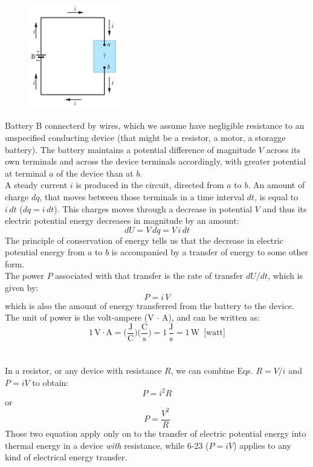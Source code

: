 \documentclass[12pt, a4paper]{article}
\begin{document}
		\begin{figure}
			\centering
			\includegraphics[width=4cm]{Physics2_PNGs/battery-circ.png}
			\caption*{}
			\label{fig:battery-circ.png}
		\end{figure}
		Battery B connecterd by wires, which we assume have negligible resistance to an unspecified conducting device (that might be a resistor, a motor, a storagge battery). The battery maintains a potential difference of magnitude $V$ across its own terminals and across the device terminals accordingly, with greater potential at terminal $a$ of the device than at $b$. \\
		A steady current $i$ is produced in the circuit, directed from $a$ to $b$. An amount of charge $dq$, that moves between those terminals in a time interval $dt$, is equal to $i \, dt$ ($dq = i \, dt$). This charges moves through a decrease in potential $V$ and thus its electric potential energy decreases in magnitude by an amount:
		\[
			dU = V \, dq = V \, i \, dt
			\tag{6-22}
		\] 
		The principle of conservation of energy tells us that the decrease in electric potential energy from $a$ to $b$ is accompanied by a transfer of energy to some other form. \\
		The power $P$ associated with that transfer is the rate of transfer $dU/dt$, which is given by:
		\[
			P = i \, V
			\tag{Rate of Electrical Energy Transfer, 6-23}
		\]
		which is also the amount of energy transferred from the battery to the device. \\
		The unit of power is the volt-ampere (V $\cdot$ A), and can be written as:
		\[
			1 \, \text{V} \cdot \text{A} = \biggl( \frac{\text{J}}{\text{C}} \biggl)
			  \biggl( \frac{\text{C}}{\text{s}} \biggl) = 1 \, \frac{\text{J}}{\text{s}}
			  = 1 \, \text{W} \, \, \, \text{[watt]}
		\]
		\\ \\
		In a resistor, or any device with resistance $R$, we can combine Eqs. $R = V / i$ and $P = iV$ to obtain:
		\[
			P = i^2 R
			\tag{Resistive Dissipation, 6-24}
		\]
		or
		\[
			P = \frac{V^2}{R}
			\tag{Resistive Dissipation, 6-25}
		\]
		Those two equation apply only on to the transfer of electric potential energy into thermal energy in a device \textit{with} resistance, while 6-23 ($P = iV$) applies to any kind of electrical energy transfer.
		
\end{document}
